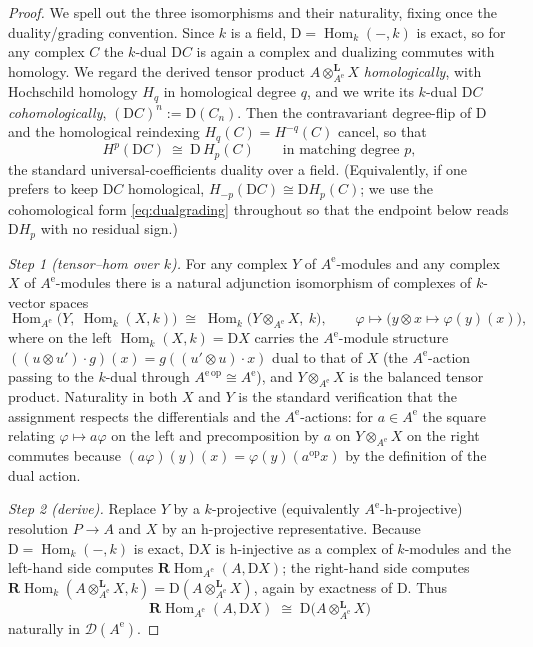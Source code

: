 \documentclass[11pt]{amsart}
\theoremstyle{definition}
\newcommand{\D}{\mathrm{D}}
\newcommand{\Hom}{\operatorname{Hom}}
\newcommand{\rHom}{\mathbf{R}\!\operatorname{Hom}}
\newcommand{\Ae}{A^{\mathrm{e}}}
\newcommand{\der}{\mathcal{D}}
\newcommand{\Lotimes}{\otimes^{\mathbf{L}}}
\newcommand{\kk}{k}
\begin{document}
\begin{proof}
We spell out the three isomorphisms and their naturality, fixing once the
duality/grading convention. Since $\kk$ is a field, $\D=\Hom_\kk(-,\kk)$ is
exact, so for any complex $C$ the $\kk$-dual $\D C$ is again a complex and
dualizing commutes with homology. We regard the derived tensor product
$A\Lotimes_{\Ae}X$ \emph{homologically}, with Hochschild homology $H_q$ in
homological degree $q$, and we write its $\kk$-dual $\D C$
\emph{cohomologically}, $(\D C)^{n}:=\D(C_{n})$. Then the contravariant
degree-flip of $\D$ and the homological reindexing $H_q(C)=H^{-q}(C)$ cancel, so
that
\begin{equation}\label{eq:dualgrading}
H^{p}(\D C)\ \cong\ \D\,H_{p}(C)\qquad\text{in matching degree }p,
\end{equation}
the standard universal-coefficients duality over a field. (Equivalently, if one
prefers to keep $\D C$ homological, $H_{-p}(\D C)\cong\D H_p(C)$; we use the
cohomological form \eqref{eq:dualgrading} throughout so that the endpoint below
reads $\D H_p$ with no residual sign.)

\emph{Step 1 (tensor--hom over $\kk$).} For any complex $Y$ of $\Ae$-modules
and any complex $X$ of $\Ae$-modules there is a natural adjunction isomorphism
of complexes of $\kk$-vector spaces
\[
\Hom_{\Ae}\bigl(Y,\ \Hom_\kk(X,\kk)\bigr)\;\cong\;
\Hom_\kk\bigl(Y\otimes_{\Ae}X,\ \kk\bigr),
\qquad
\varphi\longmapsto\bigl(y\otimes x\mapsto \varphi(y)(x)\bigr),
\]
where on the left $\Hom_\kk(X,\kk)=\D X$ carries the $\Ae$-module structure
$((u\otimes u')\!\cdot\! g)(x)=g((u'\otimes u)\cdot x)$ dual to that of $X$
(the $\Ae$-action passing to the $\kk$-dual through $A^{\mathrm e\,\mathrm{op}}\cong\Ae$),
and $Y\otimes_{\Ae}X$ is the balanced tensor product. Naturality in both $X$
and $Y$ is the standard verification that the assignment respects the
differentials and the $\Ae$-actions: for $a\in\Ae$ the square relating
$\varphi\mapsto a\varphi$ on the left and precomposition by $a$ on
$Y\otimes_{\Ae}X$ on the right commutes because
$(a\varphi)(y)(x)=\varphi(y)(a^{\mathrm{op}}x)$ by the definition of the dual
action.

\emph{Step 2 (derive).} Replace $Y$ by a $\kk$-projective (equivalently
$\Ae$-h-projective) resolution $P\to A$ and $X$ by an h-projective
representative. Because $\D=\Hom_\kk(-,\kk)$ is exact, $\D X$ is h-injective as
a complex of $\kk$-modules and the left-hand side computes
$\rHom_{\Ae}(A,\D X)$; the right-hand side computes
$\rHom_\kk(A\Lotimes_{\Ae}X,\kk)=\D(A\Lotimes_{\Ae}X)$, again by exactness of
$\D$. Thus
\[
\rHom_{\Ae}(A,\D X)\;\cong\;\D\bigl(A\Lotimes_{\Ae}X\bigr)
\]
naturally in $\der(\Ae)$.


\end{proof}
\end{document}
